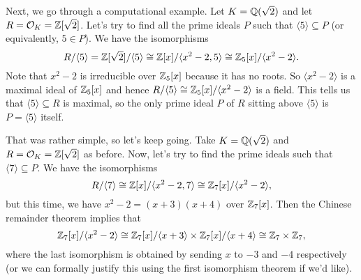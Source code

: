 Next, we go through a computational example. Let $K = \mathbb{Q}(\sqrt{2})$ 
and let $R = {\cal O}_K = \mathbb{Z}[\sqrt{2}]$. Let's try to find all the 
prime ideals $P$ such that $\langle 5 \rangle \subseteq P$ 
(or equivalently, $5 \in P$). We have the isomorphisms 
\[ R/\langle 5 \rangle = \mathbb{Z}[\sqrt{2}]/\langle 5 \rangle 
\cong \mathbb{Z}[x]/\langle x^2 -2, 5 \rangle \cong \mathbb{Z}_5[x] / \langle x^2 -2 \rangle. \] 
Note that $x^2 - 2$ is irreducible over $\mathbb{Z}_5[x]$ because it has no roots. 
So $\langle x^2 - 2 \rangle$ is a maximal ideal of $\mathbb{Z}_5[x]$ and hence 
$R/\langle 5 \rangle \cong \mathbb{Z}_5[x]/\langle x^2 - 2 \rangle$ is a field. 
This tells us that $\langle 5 \rangle \subseteq R$ is maximal, so 
the only prime ideal $P$ of $R$ sitting above $\langle 5 \rangle$ is 
$P = \langle 5 \rangle$ itself. 

That was rather simple, so let's keep going. Take $K = \mathbb{Q}(\sqrt{2})$ 
and $R = {\cal O}_K = \mathbb{Z}[\sqrt{2}]$ as before. Now, let's try to 
find the prime ideals such that $\langle 7 \rangle \subseteq P$. We have 
the isomorphisms 
\[ R/\langle 7 \rangle \cong \mathbb{Z}[x]/\langle x^2 - 2, 7 \rangle 
\cong \mathbb{Z}_7[x]/\langle x^2 - 2 \rangle, \] 
but this time, we have $x^2 - 2 = (x+3)(x+4)$ over $\mathbb{Z}_7[x]$. Then 
the Chinese remainder theorem implies that 
\[ \mathbb{Z}_7[x]/\langle x^2 - 2 \rangle \cong \mathbb{Z}_7[x]/\langle x+3\rangle 
\times \mathbb{Z}_7[x]/\langle x+4 \rangle \cong \mathbb{Z}_7 \times \mathbb{Z}_7, \] 
where the last isomorphism is obtained by sending $x$ to $-3$ and $-4$ 
respectively (or we can formally justify this using the first isomorphism
theorem if we'd like). 

